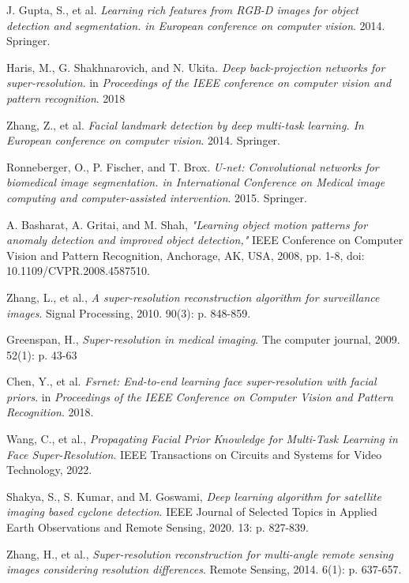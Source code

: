 \documentclass{ieeeaccess}
\begin{document}
\begin{thebibliography}{00}

 J. Gupta, S., et al. \textit{Learning rich features from RGB-D images for object detection and segmentation. in European conference on computer vision}. 2014. Springer.

 Haris, M., G. Shakhnarovich, and N. Ukita. \textit{Deep back-projection networks for super-resolution}. in \textit{Proceedings of the IEEE conference on computer vision and pattern recognition}. 2018

 Zhang, Z., et al. \textit{Facial landmark detection by deep multi-task learning. In European conference on computer vision}. 2014. Springer.

 Ronneberger, O., P. Fischer, and T. Brox. \textit{U-net: Convolutional networks for biomedical image segmentation. in International Conference on Medical image computing and computer-assisted intervention}. 2015. Springer.

 A. Basharat, A. Gritai, and M. Shah, \textit{"Learning object motion patterns for anomaly detection and improved object detection,"} IEEE Conference on Computer Vision and Pattern Recognition, Anchorage, AK, USA, 2008, pp. 1-8, doi: 10.1109/CVPR.2008.4587510.

 Zhang, L., et al., \textit{A super-resolution reconstruction algorithm for surveillance images}. Signal Processing, 2010. 90(3): p. 848-859.

 Greenspan, H., \textit{Super-resolution in medical imaging}. The computer journal, 2009. 52(1): p. 43-63

 Chen, Y., et al. \textit{Fsrnet: End-to-end learning face super-resolution with facial priors}. in \textit{Proceedings of the IEEE Conference on Computer Vision and Pattern Recognition}. 2018.

 Wang, C., et al., \textit{Propagating Facial Prior Knowledge for Multi-Task Learning in Face Super-Resolution}. IEEE Transactions on Circuits and Systems for Video Technology, 2022.

 Shakya, S., S. Kumar, and M. Goswami, \textit{Deep learning algorithm for satellite imaging based cyclone detection}. IEEE Journal of Selected Topics in Applied Earth Observations and Remote Sensing, 2020. 13: p. 827-839.

 Zhang, H., et al., \textit{Super-resolution reconstruction for multi-angle remote sensing images considering resolution differences}. Remote Sensing, 2014. 6(1): p. 637-657.


\end{thebibliography}
\end{document}

